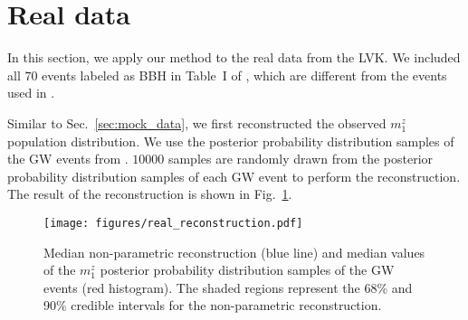 \documentclass[sn-aps, pdflatex, iicol]{sn-jnl}
\begin{document}
\section{Real data}
\label{sec:real_data}

In this section, we apply our method to the real data from the \ac{LVK}.
We included all $70$ events labeled as BBH in Table~I of \cite{KAGRA:2021duu}, which are different from the events used in \cite{LIGOScientific:2021aug}.

Similar to Sec.~\ref{sec:mock_data}, we first reconstructed the observed $m^z_1$ population distribution.
We use the posterior probability distribution samples of the \ac{GW} events from \cite{LIGOScientific:2019lzm, KAGRA:2023pio}.
$10000$ samples are randomly drawn from the posterior probability distribution samples of each \ac{GW} event to perform the reconstruction.
The result of the reconstruction is shown in Fig.~\ref{fig:real_reconstruction}.
\begin{figure}
    \texttt{[image: figures/real\_reconstruction.pdf]}
    \caption{
        Median non-parametric reconstruction (blue line) and median values of the $m^z_1$ posterior probability distribution samples of the \ac{GW} events (red histogram). The shaded regions represent the 68\% and 90\% credible intervals for the non-parametric reconstruction.
    }
    \label{fig:real_reconstruction}
\end{figure}
\end{document}
